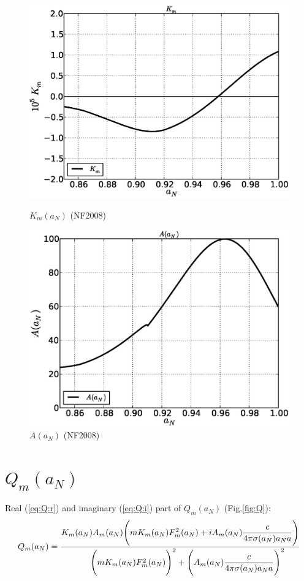 \documentclass[11pt,oneside,a4paper,notitlepage]{article}
\begin{document}
\begin{figure}[h]
\begin{center}
 \begin{minipage}[h]{0.4\linewidth}
  \includegraphics[width=1.35\linewidth]{Km.eps}
  \caption{$K_m(a_N)$ (NF2008)}
  \label{fig:km}
 \end{minipage}
 \hfill
 \begin{minipage}[h]{0.4\linewidth}
  \includegraphics[width=1.35\linewidth]{A.eps}
  \caption{$A(a_N)$ (NF2008)}
  \label{fig:A}
 \end{minipage}  
\end{center}
\end{figure}
\section{$Q_m(a_N)$}
Real (\ref{eq:Q:r}) and imaginary (\ref{eq:Q:i}) part of $Q_m(a_N)$ (Fig.\ref{fig:Q}):
\begin{equation}\label{eq:Q}
 Q_m(a_N)=\frac{K_m(a_N)A_m(a_N)\Bigg(mK_m(a_N)F_m^2(a_N)+iA_m(a_N)\dfrac{c}{4\pi\sigma(a_N)a_Na}\Bigg)}{\\
 \Bigg(mK_m(a_N)F_m^2(a_N)\Bigg)^2 +\Bigg(A_m(a_N)\dfrac{c}{4\pi\sigma(a_N)a_Na}\Bigg)^2}
\end{equation}
\end{document}
